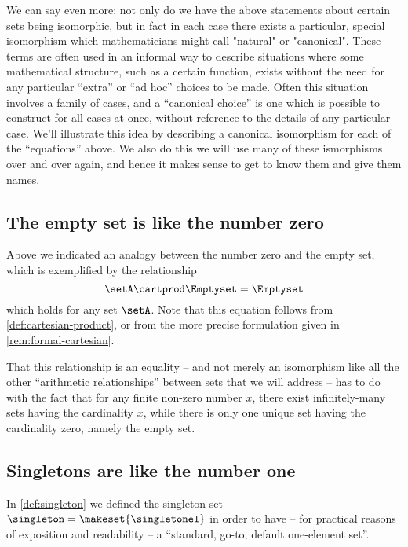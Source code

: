 
We can say even more: not only do we have the above statements about certain sets being isomorphic, but in fact in each case there exists a particular, special isomorphism which mathematicians might call "natural" or "canonical". These terms are often used in an informal way to describe situations where some mathematical structure, such as a certain function, exists without the need for any particular ``extra'' or ``ad hoc'' choices to be made. Often this situation involves a family of cases, and a ``canonical choice'' is one which is possible to construct for all cases at once, without reference to the details of any particular case. We'll illustrate this idea by describing a canonical isomorphism for each of the ``equations'' above. We also do this we will use many of these ismorphisms over and over again, and hence it makes sense to get to know them and give them names. 


\subsection{The empty set is like the number zero}

Above we indicated an analogy between the number zero and the empty set, which is exemplified by the relationship
\begin{equation}
 \setA \cartprod \Emptyset = \Emptyset
\end{equation}
which holds for any set $\setA$. Note that this equation follows from \cref{def:cartesian-product}, or from the more precise formulation given in \cref{rem:formal-cartesian}.

That this relationship is an equality -- and not merely an isomorphism like all the other ``arithmetic relationships'' between sets that we will address -- has to do with the fact that for any finite non-zero number $x$, there exist infinitely-many sets having the cardinality $x$, while there is only one unique set having the cardinality zero, namely the empty set. 

\subsection{Singletons are like the number one}


In \cref{def:singleton} we defined the singleton set $\singleton = \makeset{\singletonel}$ in order to have -- for practical reasons of exposition and readability -- a ``standard, go-to, default one-element set''.   
 
